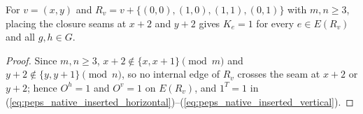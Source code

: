 \begin{lemma}%
    \label{thm:peps_native_plaquette_seam_exclusion}
    \leanok
    For $v=(x,y)$ and $R_v=v+\{(0,0),(1,0),(1,1),(0,1)\}$ with $m,n\ge 3$,
    placing the closure seams at $x+2$ and $y+2$ gives $K_e=1$ for every
    $e\in E(R_v)$ and all $g,h\in G$.
\end{lemma}
\begin{proof}\leanok
    Since $m,n\ge 3$, $x+2\notin\{x,x+1\}\pmod m$ and $y+2\notin\{y,y+1\}\pmod n$,
    so no internal edge of $R_v$ crosses the seam at $x+2$ or $y+2$; hence
    $O^h=1$ and $O^v=1$ on $E(R_v)$, and $1^T=1$ in
    (\ref{eq:peps_native_inserted_horizontal})--(\ref{eq:peps_native_inserted_vertical}).
\end{proof}

